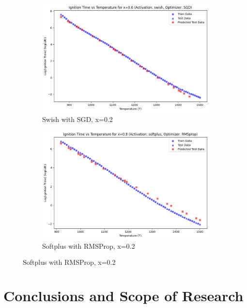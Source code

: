 \documentclass[12pt]{report}
\begin{document}
\begin{figure}[H]
    \centering
    \begin{subfigure}[t]{0.48\textwidth}
        \centering
        \includegraphics[width=\textwidth, keepaspectratio]{swish_sgd_06.png}
        \caption{Swish with SGD, x=0.2}
    \end{subfigure}
    \hfill
    \begin{subfigure}[t]{0.48\textwidth}
        \centering
        \includegraphics[width=\textwidth, keepaspectratio]{softplus_rms_08.png}
        \caption{Softplus with RMSProp, x=0.2}
    \end{subfigure}
    
\end{figure}




\chapter{Conclusions and Scope of Research}
\end{document}
